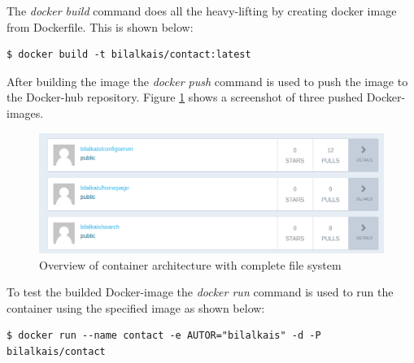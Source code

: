 The \textit{docker build} command does all the heavy-lifting by creating docker image from Dockerfile. This is shown below:

\begin{lstlisting}[frame=single]
$ docker build -t bilalkais/contact:latest
\end{lstlisting}

After building the image the \textit{docker push} command is used to push the image to the Docker-hub repository. Figure \ref{fig:dockerHub} shows a screenshot of three pushed Docker-images.

\begin{figure}[bth]
	\centering
		\includegraphics[width=1\textwidth]{gfx/dockerHub}
	\caption{Overview of container architecture with complete file system }
	\label{fig:dockerHub}
\end{figure}

To test the builded Docker-image the \textit{docker run} command is used to run the container using the specified image as shown below:
\begin{lstlisting}[frame=single]
$ docker run --name contact -e AUTOR="bilalkais" -d -P bilalkais/contact
\end{lstlisting}




